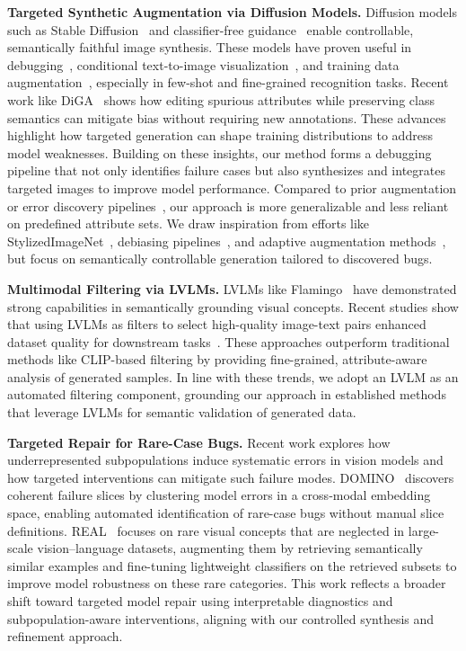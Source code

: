 \documentclass[10pt]{article} %
\begin{document}
\noindent\textbf{Targeted Synthetic Augmentation via Diffusion Models.}
Diffusion models such as Stable Diffusion~\citep{rombach2022high} and classifier-free guidance~\citep{ho2022classifierfree} enable controllable, semantically faithful image synthesis. These models have proven useful in debugging~\citep{casper2022robust, fang2024data, huang2024data}, conditional text-to-image visualization~\citep{augustin2022diffusion, boreiko2022sparse}, and training data augmentation~\citep{trabucco2023effective, dunlap2023diversify}, especially in few-shot and fine-grained recognition tasks. Recent work like DiGA~\citep{zhang2024distributionally} shows how editing spurious attributes while preserving class semantics can mitigate bias without requiring new annotations. These advances highlight how targeted generation can shape training distributions to address model weaknesses. Building on these insights, our method forms a  debugging pipeline that not only identifies failure cases but also synthesizes and integrates targeted images to improve model performance. Compared to prior augmentation or error discovery pipelines~\citep{fang2024data, huang2024data, chen2023hibug}, our approach is more generalizable and less reliant on predefined attribute sets. We draw inspiration from efforts like StylizedImageNet~\citep{geirhos2019imagenet}, debiasing pipelines~\citep{jin2021background}, and adaptive augmentation methods~\citep{mikolajczyk2023targeted, zhao2022adaptive, wang2024domain}, but focus on semantically controllable generation tailored to discovered bugs. 

\noindent\textbf{Multimodal Filtering via LVLMs.} LVLMs like Flamingo~\citep{alayrac2022flamingo} have demonstrated strong capabilities in semantically grounding visual concepts. Recent studies show that using LVLMs as filters to select high-quality image-text pairs enhanced dataset quality for downstream tasks~\citep{wang2024finetuned, li2024self}. These approaches outperform traditional methods like CLIP-based filtering by providing fine-grained, attribute-aware analysis of generated samples. In line with these trends, we adopt an LVLM as an automated filtering component, grounding our approach in established methods that leverage LVLMs for semantic validation of generated data. 

\noindent\textbf{Targeted Repair for Rare-Case Bugs.}  
Recent work explores how underrepresented subpopulations induce systematic errors in vision models and how targeted interventions can mitigate such failure modes. DOMINO~\citep{eyuboglu2022rare} discovers coherent failure slices by clustering model errors in a cross‑modal embedding space, enabling automated identification of rare-case bugs without manual slice definitions.
REAL~\citep{parashar2024neglected} focuses on rare visual concepts that are neglected in large-scale vision--language datasets, augmenting them by retrieving semantically similar examples and fine-tuning lightweight classifiers on the retrieved subsets to improve model robustness on these rare categories.
This work reflects a broader shift toward targeted model repair using interpretable diagnostics and subpopulation-aware interventions, aligning with our controlled synthesis and refinement approach.
\end{document}
